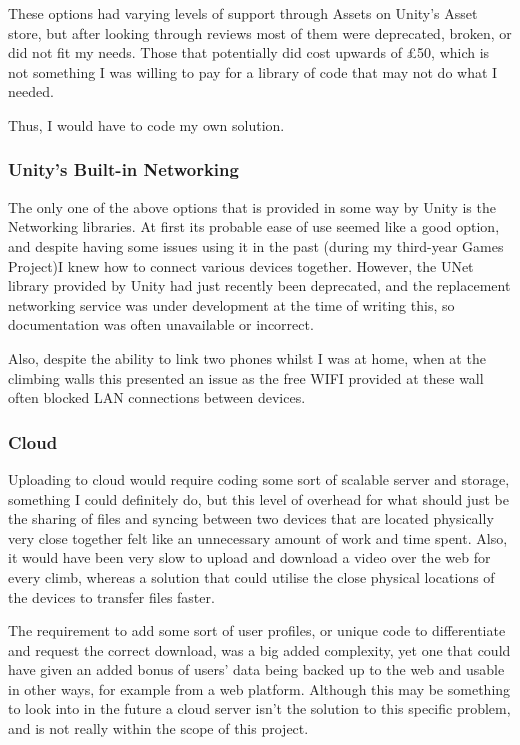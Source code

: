 These options had varying levels of support through Assets on Unity's Asset store, but after looking through reviews most of them were deprecated, broken, or did not fit my needs.
Those that potentially did cost upwards of \pounds50, which is not something I was willing to pay for a library of code that may not do what I needed.

Thus, I would have to code my own solution.


\subsubsection{Unity's Built-in Networking}
The only one of the above options that is provided in some way by Unity is the Networking libraries.
At first its probable ease of use seemed like a good option, and despite having some issues using it in the past (during my third-year Games Project)I knew how to connect various devices together.
However, the UNet library provided by Unity had just recently been deprecated, and the replacement networking service was under development at the time of writing this, so documentation was often unavailable or incorrect.

Also, despite the ability to link two phones whilst I was at home, when at the climbing walls this presented an issue as the free WIFI provided at these wall often blocked LAN connections between devices.

\subsubsection{Cloud}
Uploading to cloud would require coding some sort of scalable server and storage, something I could definitely do, but this level of overhead for what should just be the sharing of files and syncing between two devices that are located physically very close together felt like an unnecessary amount of work and time spent.
Also, it would have been very slow to upload and download a video over the web for every climb, whereas a solution that could utilise the close physical locations of the devices to transfer files faster.

The requirement to add some sort of user profiles, or unique code to differentiate and request the correct download, was a big added complexity, yet one that could have given an added bonus of users' data being backed up to the web and usable in other ways, for example from a web platform.
Although this may be something to look into in the future a cloud server isn't the solution to this specific problem, and is not really within the scope of this project.

